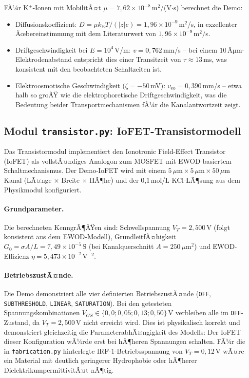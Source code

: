 ﻿\documentclass[a4paper,12pt]{scrreprt}
\theoremstyle{definition}
\begin{document}
FÃ¼r K$^+$-Ionen mit MobilitÃ¤t $\mu = 7{,}62 \times 10^{-8}$\,m$^2$/(V$\cdot$s)
berechnet die Demo:
\begin{itemize}
	\item Diffusionskoeffizient: $D = \mu k_\text{B} T / (|z| e) = 1{,}96 \times 10^{-9}$\,m$^2$/s,
	in exzellenter Ãœbereinstimmung mit dem Literaturwert von $1{,}96 \times 10^{-9}$\,m$^2$/s.
	\item Driftgeschwindigkeit bei $E = 10^4$\,V/m: $v = 0{,}762$\,mm/s --
	bei einem 10\,Âµm-Elektro\-denabstand entspricht dies einer Transitzeit von
	$\tau \approx 13$\,ms, was konsistent mit den beobachteten Schaltzeiten ist.
	\item Elektroosmotische Geschwindigkeit ($\zeta = -50$\,mV): $v_\text{eo} = 0{,}390$\,mm/s --
	etwa halb so groÃŸ wie die elektrophoretische Driftgeschwindigkeit,
	was die Bedeutung beider Transportmechanismen fÃ¼r die Kanalantwortzeit zeigt.
\end{itemize}

\subsection{Modul \texttt{transistor.py}: IoFET-Transistormodell}
\label{subsec:demo_transistor}

Das Transistormodul implementiert den Ionotronic Field-Effect Transistor (IoFET)
als vollstÃ¤ndiges Analogon zum MOSFET mit EWOD-basiertem Schaltmechanismus.
Der Demo-IoFET wird mit einem $5\,\mu\text{m} \times 5\,\mu\text{m} \times 50\,\mu\text{m}$
Kanal (LÃ¤nge $\times$ Breite $\times$ HÃ¶he) und der 0,1\,mol/L-KCl-LÃ¶sung aus
dem Physikmodul konfiguriert.

\paragraph{Grundparameter.}
Die berechneten KenngrÃ¶ÃŸen sind:
Schwellspannung $V_T = 2{,}500$\,V (folgt konsistent aus dem EWOD-Modell),
GrundleitfÃ¤higkeit $G_0 = \sigma A / L = 7{,}49 \times 10^{-5}$\,S
(bei Kanalquerschnitt $A = 250\,\mu\text{m}^2$) und
EWOD-Effizienz $\eta = 5{,}473 \times 10^{-2}$\,V$^{-2}$.

\paragraph{BetriebszustÃ¤nde.}
Die Demo demonstriert alle vier definierten BetriebszustÃ¤nde
(\texttt{OFF}, \texttt{SUBTHRESHOLD}, \texttt{LINEAR}, \texttt{SATURATION}).
Bei den getesteten Spannungskombinationen $V_{GS} \in \{0{,}0; 0{,}05; 0{,}13; 0{,}50\}$\,V
verbleiben alle im \texttt{OFF}-Zustand, da $V_T = 2{,}500$\,V nicht erreicht
wird. Dies ist physikalisch korrekt und demonstriert gleichzeitig die
ParameterabhÃ¤ngigkeit des Modells: Der IoFET dieser Konfiguration wÃ¼rde erst
bei hÃ¶heren Spannungen schalten. FÃ¼r die in \texttt{fabrication.py} hinterlegte
IRF-1-Betriebsspannung von $V_T = 0{,}12$\,V wÃ¤re ein Material mit deutlich
geringerer Hydrophobie oder hÃ¶herer DielektrikumpermittivitÃ¤t nÃ¶tig.
\end{document}
